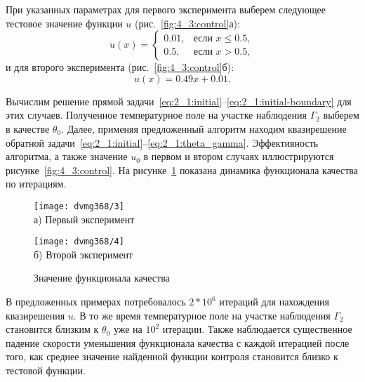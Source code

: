 При указанных параметрах для первого эксперимента выберем следующее тестовое
значение функции $u$ (рис.~\ref{fig:4_3:control}а):
\begin{equation}
    \label{eq:4_3:equation}
    u(x)=
    \begin{cases}
        0.01, & \text{если } x \le 0.5, \\
        0.5, & \text{если } x > 0.5,
    \end{cases}
\end{equation}
и для второго эксперимента (рис.~\ref{fig:4_3:control}б):
\begin{equation}
    \label{eq:4_3:test_function_1}
    u(x)=0.49x+0.01.
\end{equation}

Вычислим решение прямой
задачи~\eqref{eq:2_1:initial}--\eqref{eq:2_1:initial-boundary}
для этих случаев.
Полученное температурное поле на участке наблюдения
$\Gamma_2$ выберем в качестве $\theta_0$.
Далее, применяя предложенный алгоритм находим квазирешение обратной
задачи~\eqref{eq:2_1:initial}--\eqref{eq:2_1:theta_gamma}.
Эффективность алгоритма, а также значение $u_0$ в первом и
втором случаях иллюстрируются рисунке~\ref{fig:4_3:control}.
На рисунке~\ref{fig:4_3:cost} показана динамика функционала качества по итерациям.
\begin{figure}[ht]
    \begin{minipage}[b][][b]{0.49\linewidth}
        \centering
        \texttt{[image: dvmg368/3]} \\ а) Первый эксперимент
    \end{minipage}
    \hfill
    \begin{minipage}[b][][b]{0.49\linewidth}
        \centering
        \texttt{[image: dvmg368/4]} \\ б) Второй эксперимент
    \end{minipage}
    \caption{Значение функционала качества}
    \label{fig:4_3:cost}
\end{figure}

\begin{remark}
    В предложенных примерах потребовалось
    $2*10^6$ итераций для нахождения квазирешения $u$.
    В то же время температурное поле на участке наблюдения
    $\Gamma_2$ становится близким к $\theta_0$ уже на $10^2$ итерации.
    Также наблюдается существенное падение скорости уменьшения функционала
    качества с каждой итерацией после того, как среднее значение найденной
    функции контроля становится близко к тестовой функции.
\end{remark}

